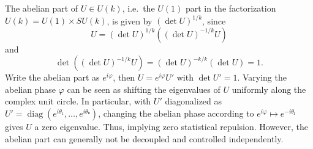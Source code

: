 \begin{remark}
  The abelian part of $U ∈ U(k)$, i.e.\ the $U(1)$ part in the factorization $U(k) = U(1) × SU(k)$, is given by $(\det U)^{1/k}$, since
  \begin{equation}
    U = (\det U)^{1/k} \left( (\det U)^{-1/k} U \right)
  \end{equation}
  and
  \begin{equation}
    \det \left( (\det U)^{-1/k} U \right) = (\det U)^{-k/k} (\det U) = 1.
  \end{equation}
  Write the abelian part as $e^{iφ}$, then $U = e^{iφ}U'$ with $\det U' = 1$. Varying the abelian phase $φ$ can be seen as shifting the eigenvalues of $U$ uniformly along the complex unit circle. In particular, with $U'$ diagonalized as $U' = \operatorname{diag}(e^{iθ₁}, …, e^{iθₖ})$, changing the abelian phase according to $e^{iφ} ↦ e^{-iθⱼ}$ gives $U$ a zero eigenvalue. Thus, implying zero statistical repulsion. However, the abelian part can generally not be decoupled and controlled independently.
\end{remark}
